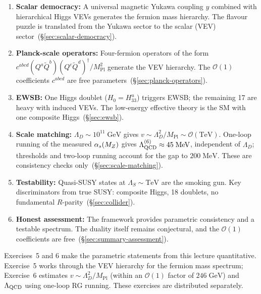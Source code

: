 \documentclass[11pt,a4paper]{article}
\begin{document}
\begin{tcolorbox}[
  enhanced,
  colback=green!5!white,
  colframe=green!60!black,
  fonttitle=\bfseries,
  title={Lecture 8: Summary}
]
\begin{enumerate}
  \item \textbf{Scalar democracy:}
    A universal magnetic Yukawa coupling $y$ combined with hierarchical
    Higgs VEVs generates the fermion mass hierarchy.  The flavour
    puzzle is translated from the Yukawa sector to the scalar (VEV)
    sector~(\S\ref{sec:scalar-democracy}).
  \item \textbf{Planck-scale operators:}
    Four-fermion operators of the form
    $c^{abcd}(Q^a\widetilde{Q}^b)(Q^c\widetilde{Q}^d)^\dagger
    / M_{\text{Pl}}^2$ generate the VEV hierarchy.  The $\mathcal{O}(1)$
    coefficients $c^{abcd}$ are free
    parameters~(\S\ref{sec:planck-operators}).
  \item \textbf{EWSB:}
    One Higgs doublet ($H_0 = H_{33}^u$) triggers EWSB; the remaining
    17 are heavy with induced VEVs.  The low-energy effective theory is
    the SM with one composite Higgs~(\S\ref{sec:ewsb}).
  \item \textbf{Scale matching:}
    $\Lambda_D \sim 10^{11}\;\text{GeV}$ gives
    $v \sim \Lambda_D^2/M_{\text{Pl}} \sim \mathcal{O}(\text{TeV})$.
    One-loop running of the measured $\alpha_s(M_Z)$ gives
    $\Lambda_{\mathrm{QCD}}^{(6)} \approx 45\;\text{MeV}$, independent of
    $\Lambda_D$; thresholds and two-loop running account for the gap to
    $200\;\text{MeV}$.  These are consistency checks
    only~(\S\ref{sec:scale-matching}).
  \item \textbf{Testability:}
    Quasi-SUSY states at $\Lambda_S \sim \text{TeV}$ are the smoking
    gun.  Key discriminators from true SUSY: composite Higgs, 18
    doublets, no fundamental
    $R$-parity~(\S\ref{sec:collider}).
  \item \textbf{Honest assessment:}
    The framework provides parametric consistency and a testable
    spectrum.  The duality itself remains conjectural, and the
    $\mathcal{O}(1)$ coefficients are
    free~(\S\ref{sec:summary-assessment}).
\end{enumerate}
\end{tcolorbox}

\begin{previewbox}[title={Exercises 5 and 6}]
  Exercises~5 and 6 make the parametric statements from this lecture
  quantitative.  Exercise~5 works through the VEV hierarchy for the
  fermion mass spectrum; Exercise~6 estimates
  $v \sim \Lambda_D^2/M_{\text{Pl}}$ (within an $\mathcal{O}(1)$ factor
  of $246\;\text{GeV}$) and $\Lambda_{\mathrm{QCD}}$ using one-loop RG
  running.  These exercises are distributed separately.
\end{previewbox}
\end{document}
